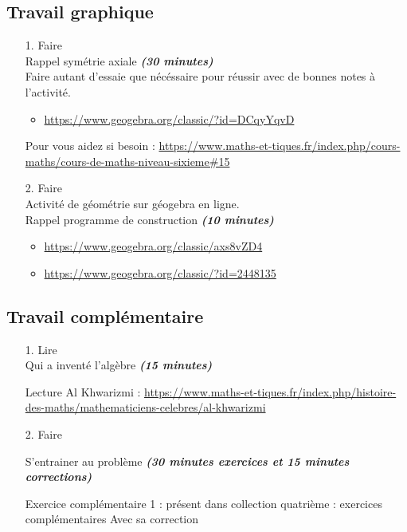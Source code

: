 \documentclass[11pt]{article}
\newcommand{\tempsexo}[1]{\textit{\textbf{(#1)}}}
\begin{document}
\subsection{Travail graphique}

\begin{enumerate}
\item[1.] \huge{Faire} \\ \normalsize 
  Rappel symétrie axiale \tempsexo{30 minutes} \\
	Faire autant d'essaie que nécéssaire pour réussir avec de bonnes notes à l'activité.

	\begin{itemize} 
    	\item \url{https://www.geogebra.org/classic/?id=DCqyYqvD} 
  	\end{itemize}
  
  Pour vous aidez si besoin : \url{https://www.maths-et-tiques.fr/index.php/cours-maths/cours-de-maths-niveau-sixieme#15}



\item[2.] \huge{Faire} \\ \normalsize 
Activité de géométrie sur géogebra en ligne. \\
Rappel programme de construction \tempsexo{10 minutes} 

	\begin{itemize} 
	  \item \url{https://www.geogebra.org/classic/axs8vZD4}
	  \item \url{https://www.geogebra.org/classic/?id=2448135}
  \end{itemize}

\end{enumerate}		
\subsection{Travail complémentaire}

\begin{enumerate}
\item[1.] \huge{Lire} \\ \normalsize 
  Qui a inventé l'algèbre \tempsexo{15 minutes}

	Lecture Al Khwarizmi : \url{https://www.maths-et-tiques.fr/index.php/histoire-des-maths/mathematiciens-celebres/al-khwarizmi}
	
\item[2.] \huge{Faire} \\ \normalsize 

  S'entrainer au problème \tempsexo{30 minutes exercices et 15 minutes corrections}

	Exercice complémentaire 1 : présent dans  collection quatrième : exercices complémentaires
	Avec sa correction
\end{enumerate}		
\end{document}
